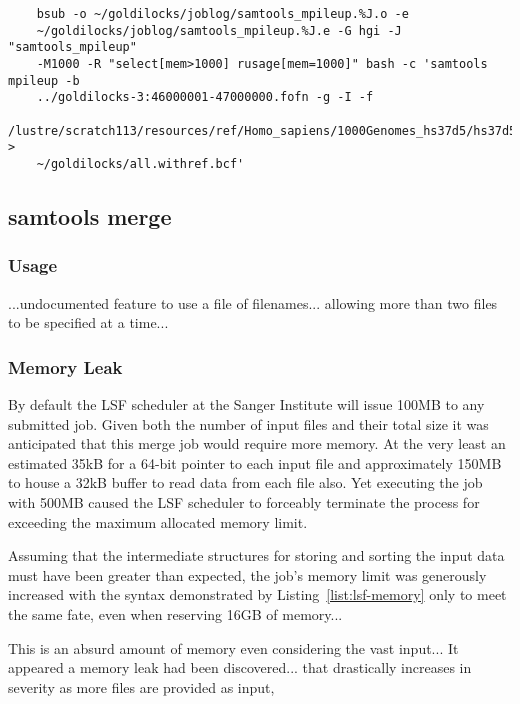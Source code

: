 \begin{verbatim}
    bsub -o ~/goldilocks/joblog/samtools_mpileup.%J.o -e
    ~/goldilocks/joblog/samtools_mpileup.%J.e -G hgi -J "samtools_mpileup"
    -M1000 -R "select[mem>1000] rusage[mem=1000]" bash -c 'samtools mpileup -b
    ../goldilocks-3:46000001-47000000.fofn -g -I -f
    /lustre/scratch113/resources/ref/Homo_sapiens/1000Genomes_hs37d5/hs37d5.fa >
    ~/goldilocks/all.withref.bcf'
\end{verbatim}


\subsection{samtools merge}

\subsubsection{Usage}
...undocumented feature to use a file of filenames... allowing more than two
files to be specified at a time...

\subsubsection{Memory Leak}

By default the LSF scheduler at the Sanger Institute will issue 100MB to any
submitted job. Given both the number of input files and their total size it was
anticipated that this merge job would require more memory. At the very least an
estimated 35kB for a 64-bit pointer to each input file and approximately 150MB
to house a 32kB buffer to read data from each file also. Yet executing the job
with 500MB caused the LSF scheduler to forceably terminate the process for
exceeding the maximum allocated memory limit.

Assuming that the intermediate structures for storing and sorting the input data
must have been greater than expected, the job's memory limit was generously
increased with the syntax demonstrated by Listing~\ref{list:lsf-memory} only to
meet the same fate, even when reserving 16GB of memory...

This is an absurd amount of memory even considering the vast input...
It appeared a memory leak had been discovered...
that drastically increases in severity as more files are provided as input,

